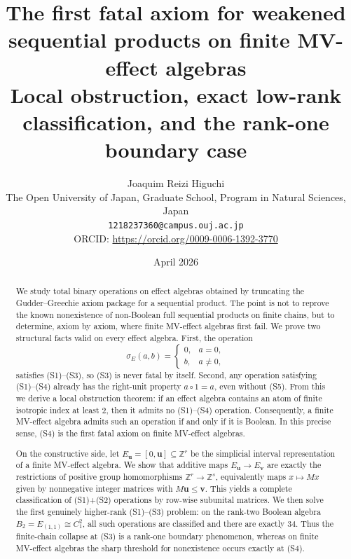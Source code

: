 \documentclass[11pt]{article}
\title{The first fatal axiom for weakened sequential products on finite MV-effect algebras\\\large Local obstruction, exact low-rank classification, and the rank-one boundary case}
\author{Joaquim Reizi Higuchi\\
\small The Open University of Japan, Graduate School, Program in Natural Sciences, Japan\\
\small \texttt{1218237360@campus.ouj.ac.jp}\\
\small ORCID: \url{https://orcid.org/0009-0006-1392-3770}}
\date{April 2026}
\theoremstyle{definition}
\theoremstyle{remark}
\numberwithin{equation}{section}
\newcommand{\ZZ}{\mathbb{Z}}
\begin{document}
\maketitle

\begin{abstract}
We study total binary operations on effect algebras obtained by truncating the Gudder--Greechie axiom package for a sequential product. The point is not to reprove the known nonexistence of non-Boolean full sequential products on finite chains, but to determine, axiom by axiom, where finite MV-effect algebras first fail. We prove two structural facts valid on every effect algebra. First, the operation
\[
\sigma_E(a,b)=
\begin{cases}
0,& a=0,\\
b,& a\neq 0,
\end{cases}
\]
satisfies \textup{(S1)}--\textup{(S3)}, so \textup{(S3)} is never fatal by itself. Second, any operation satisfying \textup{(S1)}--\textup{(S4)} already has the right-unit property $a\circ 1=a$, even without \textup{(S5)}. From this we derive a local obstruction theorem: if an effect algebra contains an atom of finite isotropic index at least $2$, then it admits no \textup{(S1)}--\textup{(S4)} operation. Consequently, a finite MV-effect algebra admits such an operation if and only if it is Boolean. In this precise sense, \textup{(S4)} is the first fatal axiom on finite MV-effect algebras.

On the constructive side, let $E_{\mathbf u}=[0,\mathbf u]\subseteq \ZZ^r$ be the simplicial interval representation of a finite MV-effect algebra. We show that additive maps $E_{\mathbf u}\to E_{\mathbf v}$ are exactly the restrictions of positive group homomorphisms $\ZZ^r\to\ZZ^s$, equivalently maps $x\mapsto Mx$ given by nonnegative integer matrices with $M\mathbf u\le \mathbf v$. This yields a complete classification of \textup{(S1)}+\textup{(S2)} operations by row-wise subunital matrices. We then solve the first genuinely higher-rank \textup{(S1)}--\textup{(S3)} problem: on the rank-two Boolean algebra $B_2=E_{(1,1)}\cong C_1^2$, all such operations are classified and there are exactly $34$. Thus the finite-chain collapse at \textup{(S3)} is a rank-one boundary phenomenon, whereas on finite MV-effect algebras the sharp threshold for nonexistence occurs exactly at \textup{(S4)}.
\end{abstract}
\end{document}
